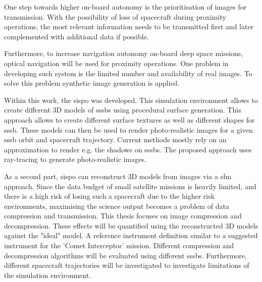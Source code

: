 One step towards higher on-board autonomy is the prioritisation of images for transmission. With the  possibility of loss of spacecraft during proximity operations, the most relevant information needs to be transmitted first and later complemented with additional data if possible.

Furthermore, to increase navigation autonomy on-board deep space missions, optical navigation will be used for proximity operations. One problem in developing such system is the limited number and availability of real images. To solve this problem synthetic image generation is applied.

Within this work, the \gls{sispo} was developed. This simulation environment allows to create different 3D models of \gls{sssb}s using procedural surface generation. This approach allows to create different surface textures as well as different shapes for \gls{sssb}. These models can then be used to render photo-realistic images for a given \gls{sssb} orbit and spacecraft trajectory. Current methods mostly rely on an approximation to render e.g. the shadows on \gls{sssb}s. The proposed approach uses ray-tracing to generate photo-realistic images.

As a second part, \gls{sispo} can reconstruct 3D models from images via a \gls{sfm} approach. Since the data budget of small satellite missions is heavily limited, and there is a high risk of losing such a spacecraft due to the higher risk environments, maximising the science output becomes a problem of data compression and transmission. 
This thesis focuses on image compression and decompression. These effects will be quantified using the reconstructed 3D models against the "ideal" model. A reference instrument definition similar to a suggested instrument for the 'Comet Interceptor' mission. Different compression and decompression algorithms will be evaluated using different \gls{sssb}s. Furthermore, different spacecraft trajectories will be investigated to investigate limitations of the simulation environment.